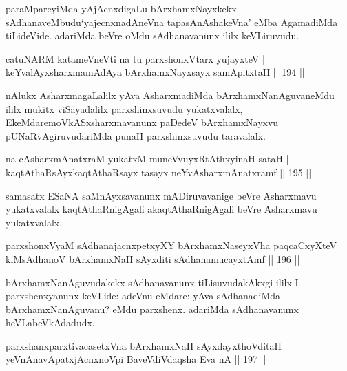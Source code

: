\begin{artha}
paraMpareyiMda yAjAcnxdigaLu bArxhamxNayxkekx sAdhanaveMbudu\break `yajecnxnadAneVna tapasAnAshakeVna' eMba AgamadiMda tiLideVide. adariMda beVre oMdu sAdhanavanunx ililx keVLiruvudu.
\end{artha}

\begin{shl}
catuNARM katameVneVti na tu parxshonxV\s tarx yujayxteV |\\
keYvalAyxsharxmamAdAya bArxhamxNayxsayx samApitxtaH \hfill || 194 ||
\end{shl}

\begin{artha}
nAlukx AsharxmagaLalilx yAva AsharxmadiMda bArxhamxNanAguvaneMdu ililx mukitx viSayadalilx parxshinxsuvudu yukatxvalalx, EkeMdare\break moVkASxsharxmavanunx paDedeV bArxhamxNayxvu pUNaRvAgiruvudariMda punaH parxshinxsuvudu taravalalx.
\end{artha}

\begin{shl}
na cA\s \s sharxmAnatxraM yukatxM muneVvuyxRtAthxyinaH sataH |\\
kaqtAthaRsAyxkaqtAthaRsayx tasayx neYvA\s \s sharxmAnatxramf \hfill || 195 ||
\end{shl}

\begin{artha}%
samasatx ESaNA saMnAyxsavanunx mADiruvavanige beVre Asharxmavu yukatxvalalx kaqtAthaRnigAgali akaqtAthaRnigAgali beVre Asharxmavu yukatxvalalx.
\end{artha}

\begin{shl}
parxshonxV\s yaM sAdhanajacnxpetxyXY bArxhamxNaseyxVha paqcaCxyXteV  |\\
kiMsAdhanoV bArxhamxNaH sAyxditi sAdhanamucayxtAmf \hfill || 196 ||
\end{shl}

\begin{artha}
bArxhamxNanAguvudakekx sAdhanavanunx tiLisuvudakAkxgi ililx I parxshenxyanunx keVLide: adeVnu eMdare:-yAva sAdhanadiMda bArxhamxNanAguvanu? eMdu parxshenx. adariMda sAdhanavanunx heVLabeVkAdadudx.
\end{artha}

\begin{shl}
parxshanxparxtivacasetxVna bArxhamxNaH sAyxdayxthoVditaH |\\
yeVnAnavApatxjAcnxnoV\s pi BaveVdiVdaqsha Eva nA \hfill || 197 ||
\end{shl}

